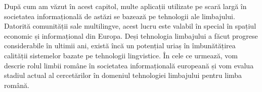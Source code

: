 \begin{multicols}{2}
După cum am văzut în acest capitol, multe aplicații utilizate pe scară largă în societatea informațională de astăzi se bazează pe tehnologii ale limbajului. Datorită comunității sale multilingve, acest lucru este valabil în special în spațiul economic și informațional din Europa. Deși tehnologia limbajului a făcut progrese considerabile în ultimii ani, există încă un potențial uriaș în îmbunătățirea calității sistemelor bazate pe tehnologii lingvistice. În cele ce urmează, vom descrie rolul limbii române în societatea informațională europeană și vom evalua stadiul actual al cercetărilor în domeniul tehnologiei limbajului pentru limba română. 

\end{multicols}

\clearpage


